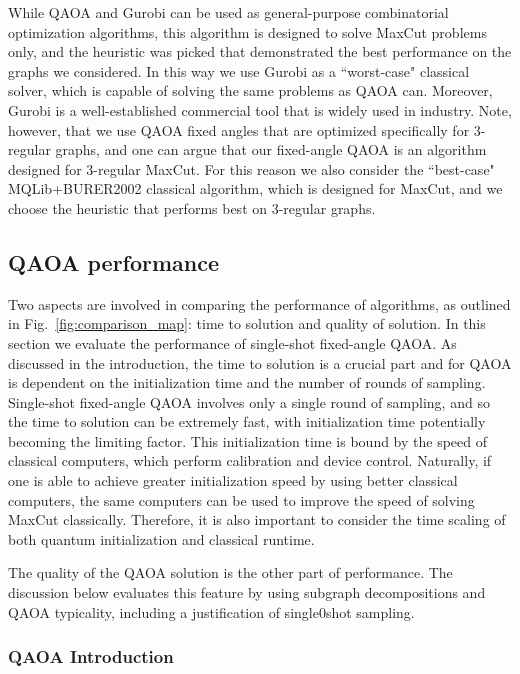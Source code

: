 \documentclass[prb,reprint,nofootinbib,longbibliography,superscriptaddress]{revtex4-1}
\begin{document}
While QAOA and Gurobi can be used as general-purpose combinatorial optimization algorithms, this algorithm is designed to
solve MaxCut problems only, and the heuristic was picked 
that demonstrated the best performance on the graphs we considered.
In this way we use Gurobi as a ``worst-case" classical solver,
which is capable of solving the same problems as QAOA can.
Moreover, Gurobi is a well-established commercial tool that is widely used in industry. 
Note, however, that we use QAOA fixed angles that are optimized specifically for 3-regular graphs, and one can argue
that our fixed-angle QAOA is an algorithm designed for 3-regular MaxCut.
For this reason we also consider the ``best-case" MQLib+BURER2002 classical algorithm, which is designed for MaxCut, and we choose the heuristic that performs best on 3-regular graphs.


\subsection{QAOA performance}\label{sec:QAOAperformance}

Two aspects are involved in  comparing the performance of algorithms, as outlined in Fig.~\ref{fig:comparison_map}: time to solution and quality of solution. In this section we evaluate the performance of single-shot fixed-angle QAOA. As discussed in the introduction, the time to solution is a crucial part and for QAOA is dependent on the initialization time and the number of rounds of sampling. Single-shot fixed-angle QAOA involves  only a single round of sampling, and so the time to solution can be extremely fast, with initialization time potentially becoming the limiting factor.
This initialization time is bound by the speed of classical computers, which perform calibration and device control. Naturally, if one is able to achieve greater initialization speed by using better classical computers, the same computers can be used to improve the speed of solving MaxCut classically. Therefore, it is also important to consider the time scaling of both quantum initialization and classical runtime.

The quality of the QAOA solution is the other part of performance. The discussion below evaluates this feature by using subgraph decompositions and QAOA typicality, including a justification of single0shot sampling.


\subsubsection{QAOA Introduction}
\label{sec:QAOA_intro}
\end{document}
